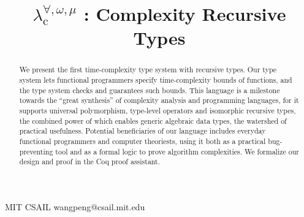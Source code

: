 \documentclass[preprint]{sigplanconf}
\newcommand{\logo}{\lambda^{\forall,\omega,\mu}_\mathrm{c}}
\begin{document}
\setlength{\pdfpageheight}{\paperheight}
\setlength{\pdfpagewidth}{\paperwidth}






\title{$\logo$ : Complexity Recursive Types}

           {MIT CSAIL}
           {wangpeng@csail.mit.edu}

\maketitle

\begin{abstract}
We present the first time-complexity type system with recursive types. Our type system lets functional programmers specify time-complexity bounds of functions, and the type system checks and guarantees such bounds. This language is a milestone towards the ``great synthesis'' of complexity analysis and programming languages, for it supports universal polymorphism, type-level operators and isomorphic recursive types, the combined power of which enables generic algebraic data types, the watershed of practical usefulness. Potential beneficiaries of our language includes everyday functional programmers and computer theoriests, using it both as a practical bug-preventing tool and as a formal logic to prove algorithm complexities. We formalize our design and proof in the Coq proof assistant.
\end{abstract}


\end{document}
